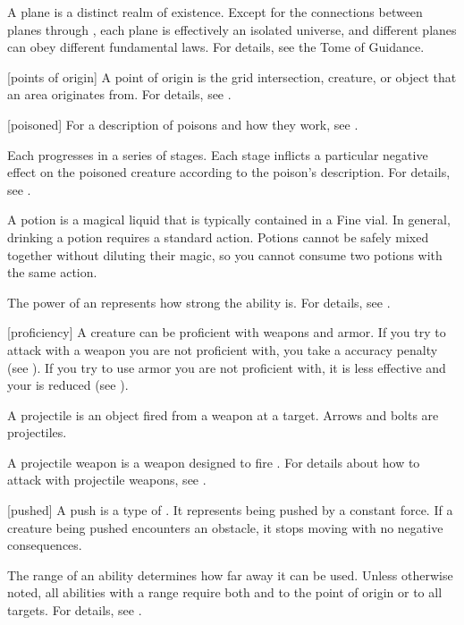  A plane is a distinct realm of existence.
Except for the connections between planes through , each plane is effectively an isolated universe, and different planes can obey different fundamental laws.
For details, see the Tome of Guidance.

[points of origin] A point of origin is the grid intersection, creature, or object that an area originates from.
For details, see .

[poisoned] For a description of poisons and how they work, see .

 Each  progresses in a series of stages.
Each stage inflicts a particular negative effect on the poisoned creature according to the poison's description.
For details, see .

 A potion is a magical liquid that is typically contained in a Fine vial.
In general, drinking a potion requires a standard action.
Potions cannot be safely mixed together without diluting their magic, so you cannot consume two potions with the same action.

 The power of an  represents how strong the ability is.
For details, see .

[proficiency] A creature can be proficient with weapons and armor.
If you try to attack with a weapon you are not proficient with, you take a  accuracy penalty (see ).
If you try to use armor you are not proficient with, it is less effective and your  is reduced (see ).

 A projectile is an object fired from a weapon at a target.
Arrows and bolts are projectiles.

 A projectile weapon is a weapon designed to fire .
For details about how to attack with projectile weapons, see .

[pushed] A push is a type of .
It represents being pushed by a constant force.
If a creature being pushed encounters an obstacle, it stops moving with no negative consequences.

 The range of an ability determines how far away it can be used.
Unless otherwise noted, all abilities with a range require both  and  to the point of origin or to all targets.
For details, see .

